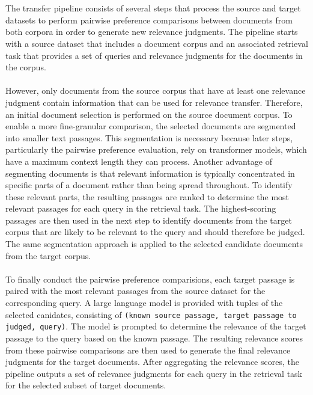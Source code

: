 \\\\
The transfer pipeline consists of several steps that process the source and target datasets to perform pairwise preference comparisons between documents from both corpora in order to generate new relevance judgments. The pipeline starts with a source dataset that includes a document corpus and an associated retrieval task that provides a set of queries and relevance judgments for the documents in the corpus.
\\\\
However, only documents from the source corpus that have at least one relevance judgment contain information that can be used for relevance transfer. Therefore, an initial document selection is performed on the source document corpus. To enable a more fine-granular comparison, the selected documents are segmented into smaller text passages. This segmentation is necessary because later steps, particularly the pairwise preference evaluation, rely on transformer models, which have a maximum context length they can process. Another advantage of segmenting documents is that relevant information is typically concentrated in specific parts of a document rather than being spread throughout. To identify these relevant parts, the resulting passages are ranked to determine the most relevant passages for each query in the retrieval task. The highest-scoring passages are then used in the next step to identify documents from the target corpus that are likely to be relevant to the query and should therefore be judged. The same segmentation approach is applied to the selected candidate documents from the target corpus.
\\\\
To finally conduct the pairwise preference comparisions, each target passage is paired with the most relevant passages from the source dataset for the corresponding query. A large language model is provided with tuples of the selected canidates, consisting of \texttt{(known source passage, target passage to judged, query)}. The model is prompted to determine the relevance of the target passage to the query based on the known passage. The resulting relevance scores from these pairwise comparisons are then used to generate the final relevance judgments for the target documents. After aggregating the relevance scores, the pipeline outputs a set of relevance judgments for each query in the retrieval task for the selected subset of target documents.
\\\\
